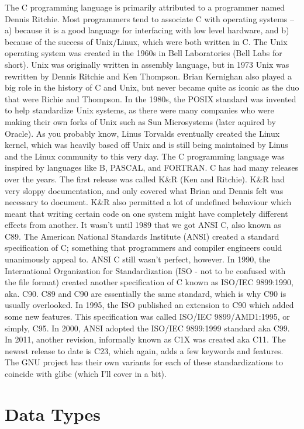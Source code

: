 \documentclass{article}
\begin{document}
The C programming language is primarily attributed to a programmer named Dennis Ritchie. Most programmers tend
to associate C with operating systems – a) because it is a good language for interfacing with low level
hardware, and b) because of the success of Unix/Linux, which were both written in C. The Unix operating system
was created in the 1960s in Bell Laboratories (Bell Labs for short). Unix was originally written in assembly
language, but in 1973 Unix was rewritten by Dennis Ritchie and Ken Thompson. Brian Kernighan also played a big
role in the history of C and Unix, but never became quite as iconic as the duo that were Richie and Thompson.
In the 1980s, the POSIX standard was invented to help standardize Unix systems, as there were many companies
who were making their own forks of Unix such as Sun Microsystems (later aquired by Oracle). As you probably
know, Linus Torvalds eventually created the Linux kernel, which was heavily based off Unix and is still being
maintained by Linus and the Linux community to this very day. The C programming language was inspired by
languages like B, PASCAL, and FORTRAN. C has had many releases over the years. The first release was called
K\&R (Ken and Ritchie). K\&R had very sloppy documentation, and only covered what Brian and Dennis felt was
necessary to document. K\&R also permitted a lot of undefined behaviour which meant that writing certain code
on one system might have completely different effects from another. It wasn’t until 1989 that we got ANSI C,
also known as C89. The American National Standards Institute (ANSI) created a standard specification of C;
something that programmers and compiler engineers could unanimously appeal to. ANSI C still wasn’t perfect,
however. In 1990, the International Organization for Standardization (ISO - not to be confused with the file
format) created another specification of C known as ISO/IEC 9899:1990, aka. C90. C89 and C90 are essentially
the same standard, which is why C90 is usually overlooked. In 1995, the ISO published an extension to C90
which added some new features. This specification was called ISO/IEC 9899/AMD1:1995, or simply, C95. In 2000,
ANSI adopted the ISO/IEC 9899:1999 standard aka C99. In 2011, another revision, informally known as C1X was
created aka C11. The newest release to date is C23, which again, adds a few keywords and features. The GNU
project has their own variants for each of these standardizations to coincide with glibc (which I’ll cover in
a bit).

\section{Data Types}
\end{document}
